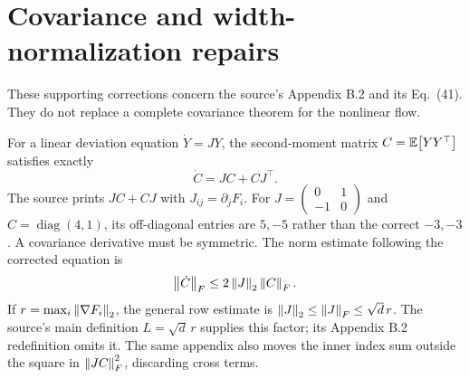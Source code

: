 \section{Covariance and width-normalization repairs}
\label{sec:covariance}
These supporting corrections concern the source's Appendix B.2 and its
Eq.~(41). They do not replace a complete covariance theorem for the nonlinear
flow.

For a linear deviation equation $\dot Y=JY$, the second-moment matrix
$C=\mathbb E\!\left[YY^\top\right]$ satisfies exactly
\begin{equation}
 \dot C=JC+CJ^\top.
 \label{eq:true-covariance}
\end{equation}
The source prints $JC+CJ$ with $J_{ij}=\partial_jF_i$. For
$J=\left(\begin{smallmatrix}0&1\\-1&0\end{smallmatrix}\right)$ and
$C=\operatorname{diag}(4,1)$, its off-diagonal entries are $5,-5$ rather
than the correct $-3,-3$. A covariance derivative must be symmetric.
The norm estimate following the corrected equation is
\begin{equation}
 \left\lVert \dot C\right\rVert_F\leq2\left\lVert J\right\rVert_2\left\lVert C\right\rVert_F.
\end{equation}
If $r=\max_i\left\lVert \nabla F_i\right\rVert_2$, the general row estimate is
$\left\lVert J\right\rVert_2\leq\left\lVert J\right\rVert_F\leq\sqrt d\,r$. The source's main definition
$L=\sqrt d\,r$ supplies this factor; its Appendix B.2 redefinition omits it.
The same appendix also moves the inner index sum outside the square in
$\left\lVert JC\right\rVert_F^2$, discarding cross terms.

